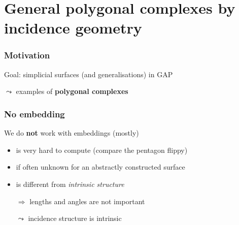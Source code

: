 \section{General polygonal complexes by incidence geometry}
\frame{\tableofcontents[currentsection]}

\begin{frame}
    \frametitle{Motivation}
    \pause
    Goal: simplicial surfaces (and generalisations) in GAP
    \pause
    \begin{center}
        
    \end{center}
    \pause
    $\leadsto$ examples of \textbf{polygonal complexes}
\end{frame}

\begin{frame}
    \frametitle{No embedding}
    \pause
    We do \textbf{not} work with embeddings (mostly)
    \begin{itemize}
        \pause
        \item is very hard to compute \pause (compare the pentagon flippy)
        \pause
        \item if often unknown for an abstractly constructed surface
        \pause
        \item is different from \textit{intrinsic structure}
        \pause
        \item[$\Rightarrow$] lengths and angles are not important
        \pause
        \item[$\leadsto$] incidence structure is intrinsic
    \end{itemize}
\end{frame}

